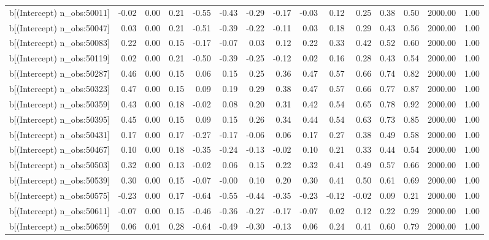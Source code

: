 \begin{table}[ht]
\begin{tabular}{rrrrrrrrrrrrrrr}
  b[(Intercept) n\_obs:50011] & -0.02 & 0.00 & 0.21 & -0.55 & -0.43 & -0.29 & -0.17 & -0.03 & 0.12 & 0.25 & 0.38 & 0.50 & 2000.00 & 1.00 \\ 
  b[(Intercept) n\_obs:50047] & 0.03 & 0.00 & 0.21 & -0.51 & -0.39 & -0.22 & -0.11 & 0.03 & 0.18 & 0.29 & 0.43 & 0.56 & 2000.00 & 1.00 \\ 
  b[(Intercept) n\_obs:50083] & 0.22 & 0.00 & 0.15 & -0.17 & -0.07 & 0.03 & 0.12 & 0.22 & 0.33 & 0.42 & 0.52 & 0.60 & 2000.00 & 1.00 \\ 
  b[(Intercept) n\_obs:50119] & 0.02 & 0.00 & 0.21 & -0.50 & -0.39 & -0.25 & -0.12 & 0.02 & 0.16 & 0.28 & 0.43 & 0.54 & 2000.00 & 1.00 \\ 
  b[(Intercept) n\_obs:50287] & 0.46 & 0.00 & 0.15 & 0.06 & 0.15 & 0.25 & 0.36 & 0.47 & 0.57 & 0.66 & 0.74 & 0.82 & 2000.00 & 1.00 \\ 
  b[(Intercept) n\_obs:50323] & 0.47 & 0.00 & 0.15 & 0.09 & 0.19 & 0.29 & 0.38 & 0.47 & 0.57 & 0.66 & 0.77 & 0.87 & 2000.00 & 1.00 \\ 
  b[(Intercept) n\_obs:50359] & 0.43 & 0.00 & 0.18 & -0.02 & 0.08 & 0.20 & 0.31 & 0.42 & 0.54 & 0.65 & 0.78 & 0.92 & 2000.00 & 1.00 \\ 
  b[(Intercept) n\_obs:50395] & 0.45 & 0.00 & 0.15 & 0.09 & 0.15 & 0.26 & 0.34 & 0.44 & 0.54 & 0.63 & 0.73 & 0.85 & 2000.00 & 1.00 \\ 
  b[(Intercept) n\_obs:50431] & 0.17 & 0.00 & 0.17 & -0.27 & -0.17 & -0.06 & 0.06 & 0.17 & 0.27 & 0.38 & 0.49 & 0.58 & 2000.00 & 1.00 \\ 
  b[(Intercept) n\_obs:50467] & 0.10 & 0.00 & 0.18 & -0.35 & -0.24 & -0.13 & -0.02 & 0.10 & 0.21 & 0.33 & 0.44 & 0.54 & 2000.00 & 1.00 \\ 
  b[(Intercept) n\_obs:50503] & 0.32 & 0.00 & 0.13 & -0.02 & 0.06 & 0.15 & 0.22 & 0.32 & 0.41 & 0.49 & 0.57 & 0.66 & 2000.00 & 1.00 \\ 
  b[(Intercept) n\_obs:50539] & 0.30 & 0.00 & 0.15 & -0.07 & -0.00 & 0.10 & 0.20 & 0.30 & 0.41 & 0.50 & 0.61 & 0.69 & 2000.00 & 1.00 \\ 
  b[(Intercept) n\_obs:50575] & -0.23 & 0.00 & 0.17 & -0.64 & -0.55 & -0.44 & -0.35 & -0.23 & -0.12 & -0.02 & 0.09 & 0.21 & 2000.00 & 1.00 \\ 
  b[(Intercept) n\_obs:50611] & -0.07 & 0.00 & 0.15 & -0.46 & -0.36 & -0.27 & -0.17 & -0.07 & 0.02 & 0.12 & 0.22 & 0.29 & 2000.00 & 1.00 \\ 
  b[(Intercept) n\_obs:50659] & 0.06 & 0.01 & 0.28 & -0.64 & -0.49 & -0.30 & -0.13 & 0.06 & 0.24 & 0.41 & 0.60 & 0.79 & 2000.00 & 1.00 \\ 

\end{tabular}
\end{table}
